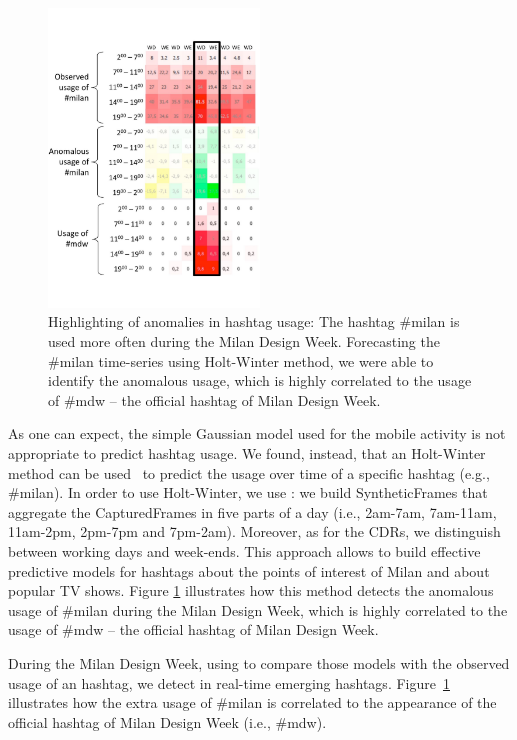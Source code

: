 \begin{figure}[t]
\begin{center}
\includegraphics[width=0.5\textwidth]{img/mdw-ht-usage} 
\caption{Highlighting of anomalies in hashtag usage: The hashtag \#milan is used more often during the Milan Design Week.
Forecasting the \#milan time-series using Holt-Winter method, we were able to identify the anomalous usage, which is highly correlated to the usage of \#mdw -- the official hashtag of Milan Design Week. }
\label{fig:L}
\end{center}
\end{figure}

As one can expect, the simple Gaussian model used for the mobile activity is not appropriate to predict hashtag usage. We found, instead, that an Holt-Winter method can be used~\cite{kalekar2004time} to predict the usage over time of a specific hashtag (e.g., \#milan). In order to use Holt-Winter, we use \frappe{}: we build \textsf{SyntheticFrames} that aggregate the \textsf{CapturedFrames} in five parts of a day (i.e., 2am-7am, 7am-11am, 11am-2pm, 2pm-7pm and 7pm-2am). Moreover, as for the CDRs, we distinguish between working days and week-ends. This approach allows to build effective predictive models for hashtags about the points of interest of Milan and about popular TV shows. Figure \ref{fig:L} illustrates how this method detects the anomalous usage of \#milan during the Milan Design Week, which is highly correlated to the usage of  \#mdw -- the official hashtag of Milan Design Week.

During the Milan Design Week, using \sti{} to compare those models with the observed usage of an hashtag, we detect in real-time emerging hashtags. Figure~\ref{fig:L} illustrates how the extra usage of \#milan is correlated to the appearance of the official hashtag of Milan Design Week (i.e., \#mdw).

